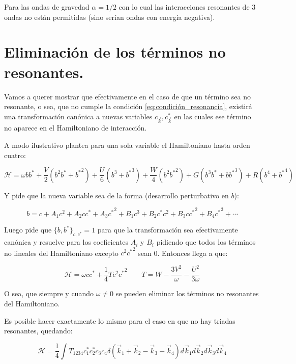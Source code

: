 Para las ondas de gravedad $\alpha=1/2$ con lo cual las interacciones resonantes de 3 ondas no están permitidas (sino serían ondas con energía negativa).

\section{Eliminación de los términos no resonantes.}
Vamos a querer mostrar que efectivamente en el caso de que un término sea no resonante, o sea, que no cumple la condición \eqref{eq:condición_resonancia}, existirá una transformación canónica a nuevas variables $c_{\vec k}, c_{\vec k}^*$ en las cuales ese término no aparece en el Hamiltoniano de interacción. 

A modo ilustrativo \cite{zakharovKolmogorovSpectraTurbulence1992} plantea para una sola variable el Hamiltoniano hasta orden cuatro:

\begin{equation}
	\mathcal{H} = \omega bb^*+\frac{V}{2}(b^2b^*+{b^*}^2) + \frac{U}{6}(b^3+{b^*}^3) + \frac{W}{4}(b^2{b^*}^2) + G(b^3b^*+b{b^*}^3) + R (b^4+{b^*}^4)
\end{equation}

Y pide que la nueva variable sea de la forma (desarrollo perturbativo en $b$):

\begin{equation}
	b = c + A_1c^2+A_2cc^*+A_3{c^*}^2 + B_1c^3+B_2c^*c^2+B_3c{c^*}^2+B_4{c^*}^3+\cdots
\end{equation}

Luego pide que $\{b,b^*\}_{c,c^*}=1$ para que la transformación sea efectivamente canónica y resuelve para los coeficientes $A_i$ y $B_i$ pidiendo que todos los términos no lineales del Hamiltoniano excepto $c^2{c^*}^2$ sean 0. Entonces llega a que:

\begin{equation}
	\mathcal{H} = \omega cc^* + \frac{1}{4} Tc^2{c^*}^2 \qquad T=W-\frac{3V^2}{\omega}-\frac{U^2}{3\omega}
\end{equation}

O sea, que siempre y cuando $\omega \neq 0$ se pueden eliminar los términos no resonantes del Hamiltoniano. 

Es posible hacer exactamente lo mismo para el caso en que no hay triadas resonantes, quedando: 

\begin{equation}
	\mathcal{H} = \frac{1}{4} \int T_{1234} c_1^*c_2^*c_3c_4\delta(\vec k_1+\vec k_2 - \vec k_3 - \vec k_4) d\vec k_1d\vec k_2 d\vec k_3 d\vec k_4
\end{equation}

